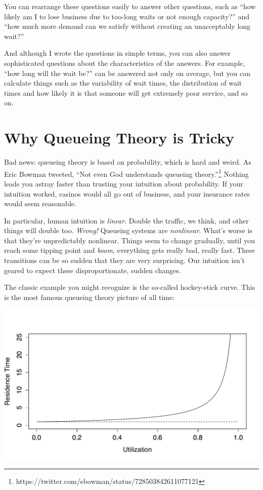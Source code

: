 \documentclass{vivid_layout}
\begin{document}
You can rearrange these questions easily to answer other questions, such as ``how likely am I to lose business due to too-long waits or not enough capacity?'' and ``how much more demand can we satisfy without creating an unacceptably long wait?''

And although I wrote the questions in simple terms, you can also answer sophisticated questions about the characteristics of the answers. For example, ``how long will the wait be?'' can be answered not only on average, but you can calculate things such as the variability of wait times, the distribution of wait times and how likely it is that someone will get extremely poor service, and so on.

\section{Why Queueing Theory is Tricky}

Bad news: queueing theory is based on probability, which is hard and weird. As Eric Bowman tweeted, ``Not even God understands queueing theory.''\footnote{https://twitter.com/ebowman/status/728503842611077121} Nothing leads you astray faster than trusting your intuition about probability. If your intuition worked, casinos would all go out of business, and your insurance rates would seem reasonable.

In particular, human intuition is {\itshape linear}. Double the traffic, we think, and other things will double too. {\itshape Wrong!} Queueing systems are {\itshape nonlinear}. What's worse is that they're unpredictably nonlinear. Things seem to change gradually, until you reach some tipping point and {\itshape boom}, everything gets really bad, really fast. These transitions can be so sudden that they are very surprising. Our intuition isn't geared to expect these disproportionate, sudden changes.

The classic example you might recognize is the so-called hockey-stick curve. This is the most famous queueing theory picture of all time:

\begin{center}
\includegraphics[width=.75\linewidth]{queueing-theory/hockey}
\end{center}
\end{document}
